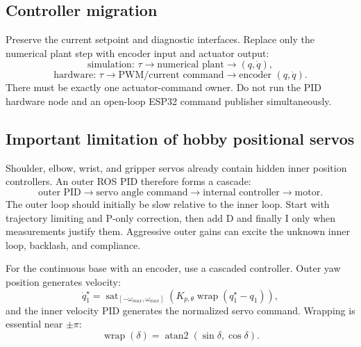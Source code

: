 \documentclass[11pt,a4paper]{article}
\newcommand{\sat}[2]{\operatorname{sat}_{#1}\!\left(#2\right)}
\begin{document}
\subsection{Controller migration}
Preserve the current setpoint and diagnostic interfaces. Replace only the
numerical plant step with encoder input and actuator output:
\[
\text{simulation: }\tau\rightarrow\text{numerical plant}\rightarrow(q,\dot q),
\]
\[
\text{hardware: }\tau\rightarrow\text{PWM/current command}\rightarrow
\text{encoder }(q,\dot q).
\]
There must be exactly one actuator-command owner. Do not run the PID hardware
node and an open-loop ESP32 command publisher simultaneously.

\subsection{Important limitation of hobby positional servos}
Shoulder, elbow, wrist, and gripper servos already contain hidden inner position
controllers. An outer ROS PID therefore forms a cascade:
\[
\text{outer PID}\rightarrow\text{servo angle command}\rightarrow
\text{internal controller}\rightarrow\text{motor}.
\]
The outer loop should initially be slow relative to the inner loop. Start with
trajectory limiting and P-only correction, then add D and finally I only when
measurements justify them. Aggressive outer gains can excite the unknown inner
loop, backlash, and compliance.

For the continuous base with an encoder, use a cascaded controller. Outer yaw
position generates velocity:
\[
\dot q_1^{\star}=\sat{[-\omega_{max},\omega_{max}]}
{K_{p,\theta}\operatorname{wrap}(q_1^{\star}-q_1)},
\]
and the inner velocity PID generates the normalized servo command. Wrapping is
essential near $\pm\pi$:
\[
\operatorname{wrap}(\delta)=\operatorname{atan2}(\sin\delta,\cos\delta).
\]
\end{document}
